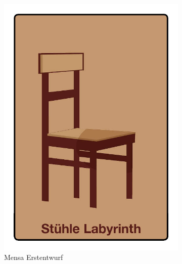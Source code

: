 \begin{figure}[H]
    \centering
    \begin{subfigure}[b]{0.2\textwidth}
        \includegraphics[width=\textwidth]{assets/mensa.jpg}
        \caption{Mensa Erstentwurf}
        \label{fig:oldMensa}
    \end{subfigure}
    ~
    \begin{subfigure}[b]{0.2\textwidth}

\end{subfigure}
\end{figure}
